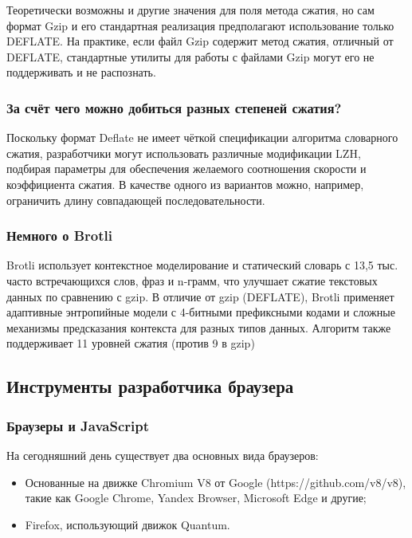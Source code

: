 \documentclass[12pt]{article}
\begin{document}
Теоретически возможны и другие значения для поля метода сжатия,
но сам формат Gzip и его стандартная реализация предполагают использование только DEFLATE.
На практике, если файл Gzip содержит метод сжатия, отличный от DEFLATE,
стандартные утилиты для работы с файлами Gzip могут его не поддерживать и не распознать.

\subsubsection{За счёт чего можно добиться разных степеней сжатия?}

Поскольку формат Deflate не имеет чёткой спецификации алгоритма словарного сжатия,
разработчики могут использовать различные модификации LZH, подбирая параметры
для обеспечения желаемого соотношения скорости и коэффициента сжатия.
В качестве одного из вариантов можно, например, ограничить длину совпадающей последовательности.

\subsubsection{Немного о Brotli}

Brotli использует контекстное моделирование и статический словарь с 13,5 тыс. часто встречающихся слов, фраз и n-грамм, что улучшает сжатие текстовых данных по сравнению с gzip.
В отличие от gzip (DEFLATE), Brotli применяет адаптивные энтропийные модели с 4-битными префиксными кодами и сложные механизмы предсказания контекста для разных типов данных.
Алгоритм также поддерживает 11 уровней сжатия (против 9 в gzip)

\subsection{Инструменты разработчика браузера}

\subsubsection{Браузеры и JavaScript}

На сегодняшний день существует два основных вида браузеров:

\begin{itemize}[label=-]
    \item Основанные на движке Chromium V8 от Google (https://github.com/v8/v8), такие как
          Google Chrome, Yandex Browser, Microsoft Edge и другие;
    \item Firefox, использующий движок Quantum.
\end{itemize}
\end{document}
